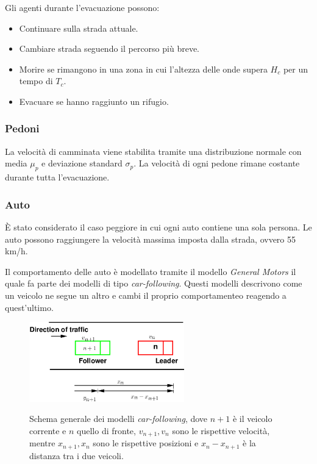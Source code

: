 \vspace*{4mm}

\noindent
Gli agenti durante l'evacuazione possono:
\begin{itemize}
  \item Continuare sulla strada attuale.
  \item Cambiare strada seguendo il percorso più breve.
  \item Morire se rimangono in una zona in cui l'altezza delle onde supera $H_c$ per un tempo di $T_c$.
  \item Evacuare se hanno raggiunto un rifugio.
\end{itemize}

\subsubsection{Pedoni}
La velocità di camminata viene stabilita tramite una distribuzione normale
con media $\mu_p$ e deviazione standard $\sigma_p$.
La velocità di ogni pedone rimane costante durante tutta l'evacuazione.


\subsubsection{Auto}
È stato considerato il caso peggiore in cui ogni auto contiene una sola persona.
Le auto possono raggiungere la velocità massima imposta dalla strada, ovvero 55 km/h.

Il comportamento delle auto è modellato tramite il modello \textit{General Motors} il quale fa parte dei modelli
di tipo \textit{car-following}. Questi modelli descrivono come un veicolo ne segue un altro
e cambi il proprio comportamenteo reagendo a quest'ultimo.

\begin{figure}[ht]
  \centering
  \includegraphics[width=0.6\textwidth]{images/GM.png}
  \label{fig:general-motors-img}
  \caption{Schema generale dei modelli \textit{car-following}, dove $n+1$ è il veicolo corrente e $n$ quello di fronte, 
  $v_{n+1}, v_{n}$ sono le rispettive velocità, mentre $x_{n+1}, x_{n}$ sono le rispettive posizioni e $x_{n} - x_{n + 1}$ è la distanza tra i due veicoli.}
\end{figure}

